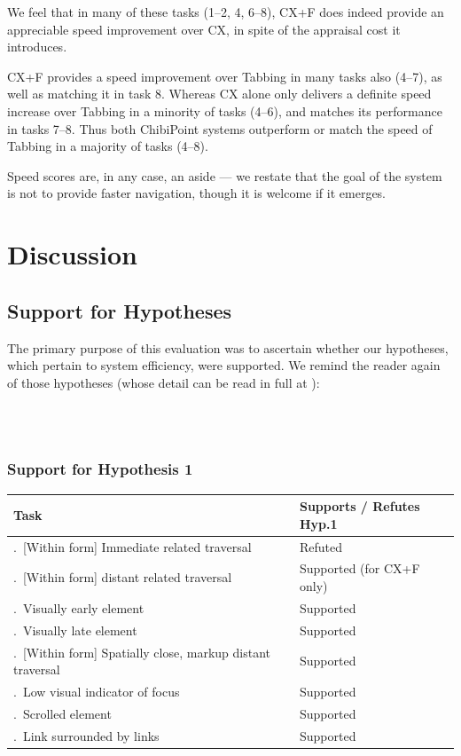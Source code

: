\documentclass[a4paper, 12pt]{report}
\begin{document}
We feel that in many of these tasks (1--2, 4, 6--8), CX+F does indeed provide an appreciable speed improvement over CX, in spite of the appraisal cost it introduces.

CX+F provides a speed improvement over Tabbing in many tasks also (4--7), as well as matching it in task 8. Whereas CX alone only delivers a definite speed increase over Tabbing in a minority of tasks (4--6), and matches its performance in tasks 7--8. Thus both ChibiPoint systems outperform or match the speed of Tabbing in a majority of tasks (4--8).

Speed scores are, in any case, an aside --- we restate that the goal of the system is not to provide faster navigation, though it is welcome if it emerges.

\section{Discussion}
\subsection{Support for Hypotheses}
The primary purpose of this evaluation was to ascertain whether our hypotheses, which pertain to system efficiency, were supported. We remind the reader again of those hypotheses (whose detail can be read in full at ):

\textbf{\hypone}\\
\textbf{\hyptwo}\\

\subsubsection{Support for Hypothesis 1}
\newcommand{\tasktablenumber}{\stepcounter{tasktablecounter}\arabic{tasktablecounter}.~}
\begin{tabular}{l l}
\hline\hline %
Task & Supports / Refutes Hyp.1 \\ [0.5ex] %
\hline %
\tasktablenumber [Within form] Immediate related traversal & Refuted\\ \relax
\tasktablenumber [Within form] distant related traversal & Supported (for CX+F only)\\ \relax
\tasktablenumber Visually early element & Supported\\ \relax
\tasktablenumber Visually late element & Supported\\ \relax
\tasktablenumber [Within form] Spatially close, markup distant traversal & Supported\\ \relax
\tasktablenumber Low visual indicator of focus & Supported\\ \relax
\tasktablenumber Scrolled element & Supported\\ \relax
\tasktablenumber Link surrounded by links & Supported\\ [1ex] %
\hline %
\end{tabular}
\end{document}
